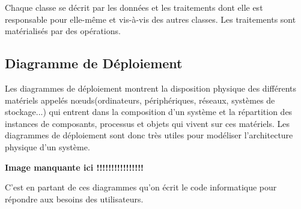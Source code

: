 Chaque classe se décrit par les données et les traitements dont elle est responsable pour elle-même et vis-à-vis des autres classes. Les traitements sont matérialisés par des opérations.


\subsection{Diagramme de Déploiement}

Les diagrammes de déploiement montrent la disposition physique des différents matériels appelés nœuds(ordinateurs, périphériques, réseaux, systèmes de stockage...) qui entrent dans la composition d’un système et la répartition des instances de composants, processus et objets qui vivent sur ces matériels. Les diagrammes de déploiement sont donc très utiles pour modéliser l’architecture physique d’un système.

\textbf{Image manquante ici !!!!!!!!!!!!!!!!}

C'est en partant de ces diagrammes qu'on écrit le code informatique pour répondre aux besoins des utilisateurs.






